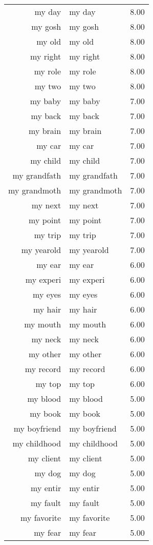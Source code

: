 \begin{table}[ht]
\begin{tabular}{rlr}
  my day & my day & 8.00 \\ 
  my gosh & my gosh & 8.00 \\ 
  my old & my old & 8.00 \\ 
  my right & my right & 8.00 \\ 
  my role & my role & 8.00 \\ 
  my two & my two & 8.00 \\ 
  my baby & my baby & 7.00 \\ 
  my back & my back & 7.00 \\ 
  my brain & my brain & 7.00 \\ 
  my car & my car & 7.00 \\ 
  my child & my child & 7.00 \\ 
  my grandfath & my grandfath & 7.00 \\ 
  my grandmoth & my grandmoth & 7.00 \\ 
  my next & my next & 7.00 \\ 
  my point & my point & 7.00 \\ 
  my trip & my trip & 7.00 \\ 
  my yearold & my yearold & 7.00 \\ 
  my ear & my ear & 6.00 \\ 
  my experi & my experi & 6.00 \\ 
  my eyes & my eyes & 6.00 \\ 
  my hair & my hair & 6.00 \\ 
  my mouth & my mouth & 6.00 \\ 
  my neck & my neck & 6.00 \\ 
  my other & my other & 6.00 \\ 
  my record & my record & 6.00 \\ 
  my top & my top & 6.00 \\ 
  my blood & my blood & 5.00 \\ 
  my book & my book & 5.00 \\ 
  my boyfriend & my boyfriend & 5.00 \\ 
  my childhood & my childhood & 5.00 \\ 
  my client & my client & 5.00 \\ 
  my dog & my dog & 5.00 \\ 
  my entir & my entir & 5.00 \\ 
  my fault & my fault & 5.00 \\ 
  my favorite & my favorite & 5.00 \\ 
  my fear & my fear & 5.00 \\ 

\end{tabular}
\end{table}
